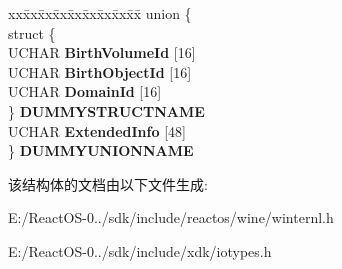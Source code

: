\begin{DoxyCompactItemize}
\begin{tabbing}
\end{tabbing}\item 
\mbox{\label{struct___f_i_l_e___o_b_j_e_c_t_i_d___i_n_f_o_r_m_a_t_i_o_n_a11bc042fcb3c5ef8a07a03dbc87c8aff}} 
\begin{tabbing}
xx\=xx\=xx\=xx\=xx\=xx\=xx\=xx\=xx\=\kill
union \{\\
\>struct \{\\
\>\>UCHAR {\bfseries BirthVolumeId} \mbox{[}16\mbox{]}\\
\>\>UCHAR {\bfseries BirthObjectId} \mbox{[}16\mbox{]}\\
\>\>UCHAR {\bfseries DomainId} \mbox{[}16\mbox{]}\\
\>\} {\bfseries DUMMYSTRUCTNAME}\\
\>UCHAR {\bfseries ExtendedInfo} \mbox{[}48\mbox{]}\\
\} {\bfseries DUMMYUNIONNAME}\\

\end{tabbing}\end{DoxyCompactItemize}


该结构体的文档由以下文件生成\+:\begin{DoxyCompactItemize}
\item 
E\+:/\+React\+O\+S-\/0../sdk/include/reactos/wine/winternl.\+h\item 
E\+:/\+React\+O\+S-\/0../sdk/include/xdk/iotypes.\+h\end{DoxyCompactItemize}

